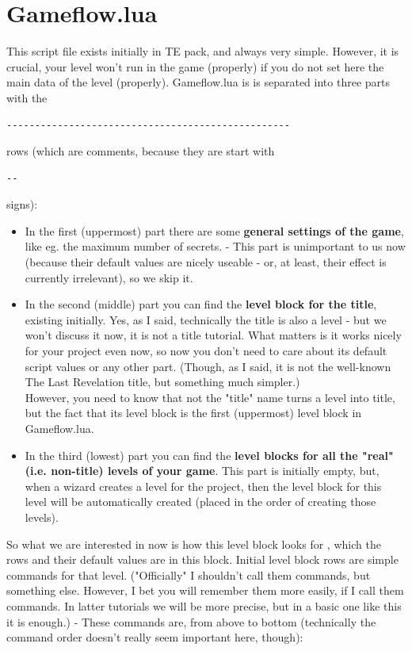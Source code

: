\section{Gameflow.lua}

This script file exists initially in TE pack, and always very simple. However, it is crucial, your level won't run in the game (properly) if you do not set here the main data of the level (properly).
Gameflow.lua is is separated into three parts with the 
\begin{lstlisting}[style=lua]
--------------------------------------------------
\end{lstlisting}
 rows (which are comments, because they are start with 
\begin{lstlisting}[style=lua]
--
\end{lstlisting}
signs):
\begin{itemize}
    \item In the first (uppermost) part there are some \textbf{general settings of the game}, like eg. the maximum number of secrets. - This part is unimportant to us now (because their default values are nicely useable - or, at least, their effect is currently irrelevant), so we skip it.
    \item In the second (middle) part you can find the \textbf{level block for the title}, existing initially. Yes, as I said, technically the title is also a level - but we won't discuss it now, it is not a title tutorial. What matters is it works nicely for your project even now, so now you don't need to care about its default script values or any other part. (Though, as I said, it is not the well-known The Last Revelation title, but something much simpler.) \\ However, you need to know that not the "title" name turns a level into title, but the fact that its level block is the first (uppermost) level block in Gameflow.lua.
    \item In the third (lowest) part you can find the \textbf{level blocks for all the "real" (i.e. non-title) levels of your game}. This part is initially empty, but, when a wizard creates a level for the project, then the level block for this level will be automatically created (placed in the order of creating those levels).
\end{itemize}

So what we are interested in now is how this level block looks for , which the rows and their default values are in this block.
Initial level block rows are simple commands for that level. ("Officially" I shouldn't call them commands, but something else. However, I bet you will remember them more easily, if I call them commands. In latter tutorials we will be more precise, but in a basic one like this it is enough.) - These commands are, from above to bottom (technically the command order doesn't really seem important here, though):

